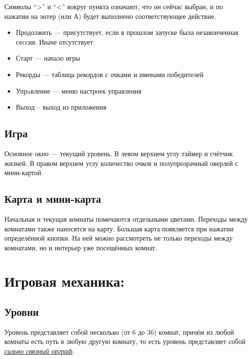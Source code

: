 \documentclass[12pt,a4paper]{article}
\begin{document}

Символы ``>'' и ``<'' вокруг пункта означают, что он сейчас выбран, и по нажатии на энтер (или А) будет выполнено соответствующее действие.

\begin{itemize}
\item Продолжить --- присутствует, если в прошлом запуске была незаконченная сессия. Иначе отсутствует
\item Старт --- начало игры
\item Рекорды --- таблица рекордов с очками и именами победителей
\item Упрaвление --- меню настроек управления
\item Выход -- выход из приложения\\
\end{itemize}

\subsection{Игра}

Основное окно --- текущий уровень. В левом верхнем углу таймер и счётчик жизней. В правом верхнем углу количество очков и полупрозрачный оверлей с мини-картой.\\

\subsection{Карта и мини-карта}
Начальная и текущая комнаты помечаются отдельными цветами. Переходы между комнатами также наносятся на карту.
Большая карта появляется при нажатии определённой кнопки. На ней можно рассмотреть не только переходы между комнатами, но и интерьер уже посещённых комнат.\\


\section{Игровая механика:}
\subsection{Уровни}
Уровень представляет собой несколько (от 6 до 36) комнат, причём из любой комнаты есть путь в любую другую комнату, то есть уровень представляет собой \href{http://ru.wikipedia.org/wiki/%
}{\textit{сильно связный орграф}}.
\end{document}
